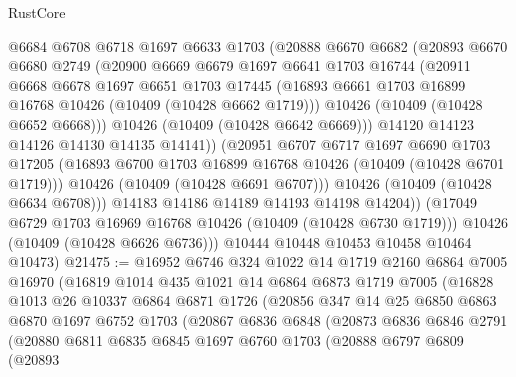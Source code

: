 \begin{lexlean}{RustCore}
\begin{coremodule}
              @6684
              @6708
              @6718
              @1697
              @6633
              @1703
              (@20888
                @6670
                @6682
                (@20893
                  @6670
                  @6680
                  @2749
                  (@20900
                    @6669
                    @6679
                    @1697
                    @6641
                    @1703
                    @16744
                    (@20911
                      @6668
                      @6678
                      @1697
                      @6651
                      @1703
                      @17445
                      (@16893 @6661 @1703 @16899 @16768 @10426 (@10409 (@10428 @6662 @1719)))
                      @10426
                      (@10409 (@10428 @6652 @6668)))
                    @10426
                    (@10409 (@10428 @6642 @6669)))
                  @14120
                  @14123
                  @14126
                  @14130
                  @14135
                  @14141))
              (@20951
                @6707
                @6717
                @1697
                @6690
                @1703
                @17205
                (@16893 @6700 @1703 @16899 @16768 @10426 (@10409 (@10428 @6701 @1719)))
                @10426
                (@10409 (@10428 @6691 @6707)))
              @10426
              (@10409 (@10428 @6634 @6708)))
            @14183
            @14186
            @14189
            @14193
            @14198
            @14204))
        (@17049 @6729 @1703 @16969 @16768 @10426 (@10409 (@10428 @6730 @1719)))
        @10426
        (@10409 (@10428 @6626 @6736)))
      @10444
      @10448
      @10453
      @10458
      @10464
      @10473)
@21475 := @16952
    @6746
    @324
    @1022
    @14
    @1719
    @2160
    @6864
    @7005
    @16970
    (@16819
      @1014
      @435
      @1021
      @14
      @6864
      @6873
      @1719
      @7005
      (@16828
        @1013
        @26
        @10337
        @6864
        @6871
        @1726
        (@20856
          @347
          @14
          @25
          @6850
          @6863
          @6870
          @1697
          @6752
          @1703
          (@20867
            @6836
            @6848
            (@20873
              @6836
              @6846
              @2791
              (@20880
                @6811
                @6835
                @6845
                @1697
                @6760
                @1703
                (@20888
                  @6797
                  @6809
                  (@20893

\end{coremodule}
\end{lexlean}
